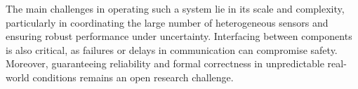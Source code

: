 \documentclass[a4paper]{article}
\begin{document}
The main challenges in operating such a system lie in its scale and complexity, particularly in coordinating the large number of heterogeneous sensors and ensuring robust performance under uncertainty. Interfacing between components is also critical, as failures or delays in communication can compromise safety. Moreover, guaranteeing reliability and formal correctness in unpredictable real-world conditions remains an open research challenge.


% 
% 
\end{document}
